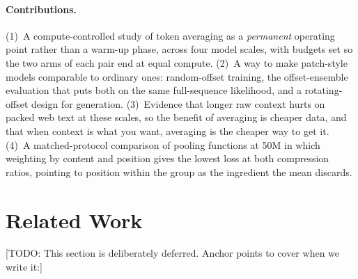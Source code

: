 \documentclass[11pt]{article}
\newcommand{\todo}[1]{\textcolor{warnred}{[TODO: #1]}}
\begin{document}
\paragraph{Contributions.}
(1)~A compute-controlled study of token averaging as a \emph{permanent}
operating point rather than a warm-up phase, across four model scales, with
budgets set so the two arms of each pair end at equal compute.
(2)~A way to make patch-style models comparable to ordinary ones:
random-offset training, the offset-ensemble evaluation that puts both on the
same full-sequence likelihood, and a rotating-offset design for generation.
(3)~Evidence that longer raw context hurts on packed web text at these
scales, so the benefit of averaging is cheaper data, and that when context is
what you want, averaging is the cheaper way to get it. (4)~A
matched-protocol comparison of pooling functions at 50M in which weighting by
content and position gives the lowest loss at both compression ratios,
pointing to position within the group as the ingredient the mean discards.

\section{Related Work}
\label{sec:related}

\todo{This section is deliberately deferred. Anchor points to cover when we
write it:}
\end{document}

